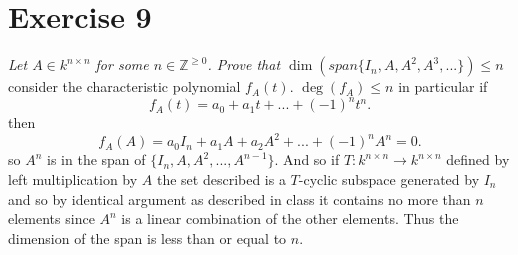 \documentclass{article}
\begin{document}
    \section{Exercise 9}
    \emph{
        Let $A \in k^{n \times n}$ for some $n \in \mathbb{Z}^{\ge 0}$. Prove that $\dim(span\{I_n,A,A^2,A^{3},...\}) \le n$
    }
    consider the characteristic polynomial  $f_A(t)$.  $\deg(f_A) \le n$ in particular if
     \[
    f_A(t) = a_0 + a_1t + ... + (-1)^{n}t^{n}
    .\] 
    then
    \[
    f_A(A) = a_0I_n + a_1A + a_2A^2 + ... + (-1)^{n}A^{n} = 0
    .\] 
    so $A^{n}$ is in the span of $\{I_n,A,A^2,...,A^{n-1}\}$. And so if $T: k^{n \times n} \rightarrow k^{n \times n}$ defined
    by left multiplication by $A$ the set described is a $T$-cyclic subspace generated by $I_n$ 
    and so by identical argument as described in class it contains no more than $n$ elements since $A^{n}$ is a linear combination of
    the other elements. Thus the dimension of the span is less than or equal to $n$.
\end{document}
